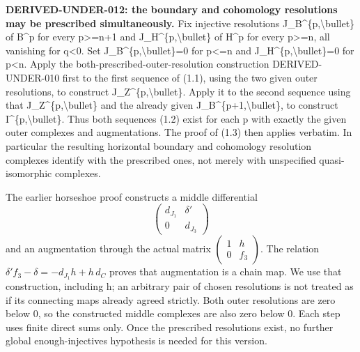 \textbf{DERIVED-UNDER-012:\allowbreak{} the boundary and cohomology resolutions may be prescribed simultaneously.} Fix injective resolutions J\_\allowbreak{}B\textasciicircum{}\{p,\allowbreak{}\textbackslash{}bullet\} of B\^{}p for every p>\allowbreak{}=n\allowbreak{}+1 and J\_\allowbreak{}H\textasciicircum{}\{p,\allowbreak{}\textbackslash{}bullet\} of H\^{}p for every p>\allowbreak{}=n,\allowbreak{} all vanishing for q\textless0. Set J\_\allowbreak{}B\textasciicircum{}\{p,\allowbreak{}\textbackslash{}bullet\}\allowbreak{}=0 for p<\allowbreak{}=n and J\_\allowbreak{}H\textasciicircum{}\{p,\allowbreak{}\textbackslash{}bullet\}\allowbreak{}=0 for p\textless n. Apply the both-prescribed-outer-resolution construction DERIVED-UNDER-010 first to the first sequence of (1.1)\allowbreak{},\allowbreak{} using the two given outer resolutions,\allowbreak{} to construct J\_\allowbreak{}Z\textasciicircum{}\{p,\allowbreak{}\textbackslash{}bullet\}. Apply it to the second sequence using that J\_\allowbreak{}Z\textasciicircum{}\{p,\allowbreak{}\textbackslash{}bullet\} and the already given J\_\allowbreak{}B\textasciicircum{}\{p\allowbreak{}+1,\allowbreak{}\textbackslash{}bullet\},\allowbreak{} to construct I\textasciicircum{}\{p,\allowbreak{}\textbackslash{}bullet\}. Thus both sequences (1.2)\allowbreak{} exist for each p with exactly the given outer complexes and augmentations. The proof of (1.3)\allowbreak{} then applies verbatim. In particular the resulting horizontal boundary and cohomology resolution complexes identify with the prescribed ones,\allowbreak{} not merely with unspecified quasi-isomorphic complexes.

The earlier horseshoe proof constructs a middle differential \[
 \begin{pmatrix}d_{J_1}&\delta'\\0&d_{J_3}\end{pmatrix}
\] and an augmentation through the actual matrix \(\left(\begin{smallmatrix}1&h\\0&f_3\end{smallmatrix}\right)\). The relation \(\delta'f_3-\delta=-d_{J_1}h+h\,d_C\) proves that augmentation is a chain map. We use that construction,\allowbreak{} including h; an arbitrary pair of chosen resolutions is not treated as if its connecting maps already agreed strictly. Both outer resolutions are zero below 0,\allowbreak{} so the constructed middle complexes are also zero below 0. Each step uses finite direct sums only. Once the prescribed resolutions exist,\allowbreak{} no further global enough-injectives hypothesis is needed for this version.

